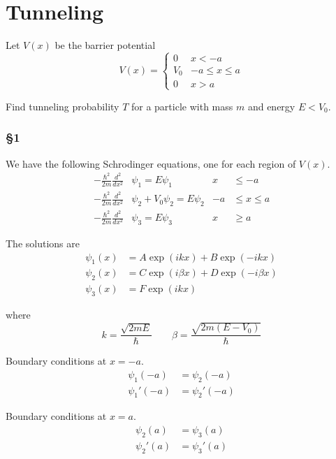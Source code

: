 


\section*{Tunneling}

Let $V(x)$ be the barrier potential
\begin{equation*}
V(x)=\begin{cases}
0 & x<-a
\\
V_0 & -a\le x\le a
\\
0 & x>a
\end{cases}
\end{equation*}

Find tunneling probability $T$ for a particle with mass $m$ and energy $E<V_0$.

\subsubsection*{\S1}

We have the following Schrodinger equations, one for each region of $V(x)$.
\begin{align*}
-\frac{\hbar^2}{2m}\frac{d^2}{dx^2}&\psi_1=E\psi_1 & x&\le-a
\\[1ex]
-\frac{\hbar^2}{2m}\frac{d^2}{dx^2}&\psi_2+V_0\psi_2=E\psi_2 & -a&\le x\le a
\\[1ex]
-\frac{\hbar^2}{2m}\frac{d^2}{dx^2}&\psi_3=E\psi_3 & x&\ge a
\end{align*}

The solutions are
\begin{align*}
\psi_1(x)&=A\exp(ikx)+B\exp(-ikx)
\\
\psi_2(x)&=C\exp(i\beta x)+D\exp(-i\beta x)
\\
\psi_3(x)&=F\exp(ikx)
\end{align*}

where
\begin{equation*}
k=\frac{\sqrt{2mE}}{\hbar}
\qquad
\beta=\frac{\sqrt{2m(E-V_0)}}{\hbar}
\end{equation*}

Boundary conditions at $x=-a$.
\begin{align*}
\psi_1(-a)&=\psi_2(-a)
\\
\psi_1'(-a)&=\psi_2'(-a)
\end{align*}

Boundary conditions at $x=a$.
\begin{align*}
\psi_2(a)&=\psi_3(a)
\\
\psi_2'(a)&=\psi_3'(a)
\end{align*}

